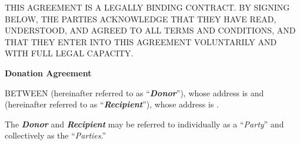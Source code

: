 
\begin{sloppypar}
THIS AGREEMENT IS A LEGALLY BINDING CONTRACT. BY SIGNING BELOW, THE PARTIES ACKNOWLEDGE THAT THEY HAVE READ, UNDERSTOOD, AND AGREED TO ALL TERMS AND CONDITIONS, AND THAT THEY ENTER INTO THIS AGREEMENT VOLUNTARILY AND WITH FULL LEGAL CAPACITY.
\end{sloppypar}

\begin{center}

\textbf{Donation Agreement}

\end{center}

\begin{sloppypar}
BETWEEN \DonorName{} (hereinafter referred to as “\textbf{\textit{Donor}}”), whose address is \DonorAddress{} and \RecipientName{} (hereinafter referred to as  “\textbf{\textit{Recipient}}”), whose address is \RecipientAddress{}.
\end{sloppypar}

\vspace{0.3cm}

The \textit{\textbf{Donor}} and \textit{\textbf{Recipient}} may be referred to individually as a “\textit{Party}” and collectively as the “\textit{Parties}.”

